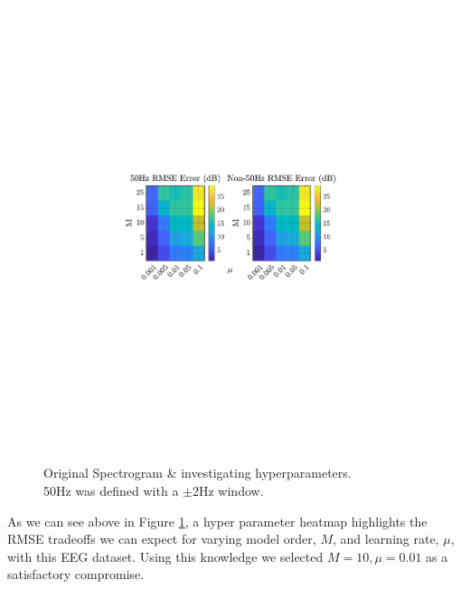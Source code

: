\documentclass[12pt]{article}
\numberwithin{equation}{section}
\begin{document}
\begin{figure}[H]
\begin{subfigure}{0.49\textwidth}
					\includegraphics[trim={2.8cm 11.2cm 3.00cm  11.2cm}, clip, width=\textwidth]{../MATLAB/figures/q2_3d_fig06.pdf} 
					\captionsetup{justification=centering}
				\end{subfigure}
				
				\captionsetup{justification=centering}
				\caption{ Original Spectrogram \& investigating hyperparameters. \\
						  50Hz was defined with a $\pm$2Hz window. }
				\label{fig: 2-3d-orig+paramSweep}
			\end{figure}
		
			As we can see above in Figure \ref{fig: 2-3d-orig+paramSweep}, a hyper parameter heatmap highlights the RMSE tradeoffs we can expect for varying model order, $M$, and learning rate, $\mu$, with this EEG dataset. Using this knowledge we selected $M=10,\mu=0.01$ as a satisfactory compromise. 
			
\end{document}
